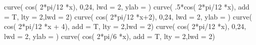 \documentclass[
  letterpaper,
  DIV=11,
  numbers=noendperiod]{scrartcl}
\newenvironment{Shaded}{\begin{snugshade}}{\end{snugshade}}
\newcommand{\AttributeTok}[1]{\textcolor[rgb]{0.40,0.45,0.13}{#1}}
\newcommand{\DecValTok}[1]{\textcolor[rgb]{0.68,0.00,0.00}{#1}}
\newcommand{\FunctionTok}[1]{\textcolor[rgb]{0.28,0.35,0.67}{#1}}
\newcommand{\NormalTok}[1]{\textcolor[rgb]{0.00,0.23,0.31}{#1}}
\newcommand{\SpecialCharTok}[1]{\textcolor[rgb]{0.37,0.37,0.37}{#1}}
\newcommand{\StringTok}[1]{\textcolor[rgb]{0.13,0.47,0.30}{#1}}
\theoremstyle{definition}
\theoremstyle{definition}
\theoremstyle{plain}
\theoremstyle{plain}
\theoremstyle{remark}
\begin{document}
\begin{Shaded}
\begin{Highlighting}[]
\FunctionTok{curve}\NormalTok{( }\FunctionTok{cos}\NormalTok{( }\DecValTok{2}\SpecialCharTok{*}\NormalTok{pi}\SpecialCharTok{/}\DecValTok{12} \SpecialCharTok{*}\NormalTok{x), }\DecValTok{0}\NormalTok{,}\DecValTok{24}\NormalTok{, }\AttributeTok{lwd =} \DecValTok{2}\NormalTok{, }\AttributeTok{ylab =} \StringTok{\textquotesingle{}\textquotesingle{}}\NormalTok{)}
\FunctionTok{curve}\NormalTok{( .}\DecValTok{5}\SpecialCharTok{*}\FunctionTok{cos}\NormalTok{( }\DecValTok{2}\SpecialCharTok{*}\NormalTok{pi}\SpecialCharTok{/}\DecValTok{12} \SpecialCharTok{*}\NormalTok{x), }\AttributeTok{add =}\NormalTok{ T, }\AttributeTok{lty =} \DecValTok{2}\NormalTok{,}\AttributeTok{lwd =} \DecValTok{2}\NormalTok{)}
\FunctionTok{curve}\NormalTok{( }\FunctionTok{cos}\NormalTok{( }\DecValTok{2}\SpecialCharTok{*}\NormalTok{pi}\SpecialCharTok{/}\DecValTok{12} \SpecialCharTok{*}\NormalTok{x}\SpecialCharTok{+}\DecValTok{2}\NormalTok{), }\DecValTok{0}\NormalTok{,}\DecValTok{24}\NormalTok{, }\AttributeTok{lwd =} \DecValTok{2}\NormalTok{, }\AttributeTok{ylab =} \StringTok{\textquotesingle{}\textquotesingle{}}\NormalTok{)}
\FunctionTok{curve}\NormalTok{( }\FunctionTok{cos}\NormalTok{( }\DecValTok{2}\SpecialCharTok{*}\NormalTok{pi}\SpecialCharTok{/}\DecValTok{12} \SpecialCharTok{*}\NormalTok{x }\SpecialCharTok{+} \DecValTok{4}\NormalTok{), }\AttributeTok{add =}\NormalTok{ T, }\AttributeTok{lty =} \DecValTok{2}\NormalTok{,}\AttributeTok{lwd =} \DecValTok{2}\NormalTok{)}
\FunctionTok{curve}\NormalTok{( }\FunctionTok{cos}\NormalTok{( }\DecValTok{2}\SpecialCharTok{*}\NormalTok{pi}\SpecialCharTok{/}\DecValTok{12} \SpecialCharTok{*}\NormalTok{x), }\DecValTok{0}\NormalTok{,}\DecValTok{24}\NormalTok{, }\AttributeTok{lwd =} \DecValTok{2}\NormalTok{, }\AttributeTok{ylab =} \StringTok{\textquotesingle{}\textquotesingle{}}\NormalTok{)}
\FunctionTok{curve}\NormalTok{( }\FunctionTok{cos}\NormalTok{( }\DecValTok{2}\SpecialCharTok{*}\NormalTok{pi}\SpecialCharTok{/}\DecValTok{6} \SpecialCharTok{*}\NormalTok{x), }\AttributeTok{add =}\NormalTok{ T, }\AttributeTok{lty =} \DecValTok{2}\NormalTok{,}\AttributeTok{lwd =} \DecValTok{2}\NormalTok{)}
\end{Highlighting}
\end{Shaded}
\end{document}
